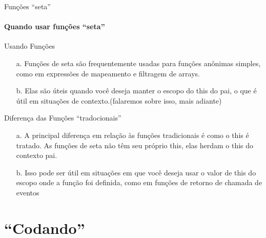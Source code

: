 \documentclass[13pt, xcolor={dvipsnames,svgnames}, portuguese]{beamer}
\begin{document}
\begin{frame}{Funções ``seta''}
\framesubtitle{Quando usar funções ``seta''}
	\begin{block}{Usando Funções}
		\begin{itemize}
		  \item[a.] Funções de seta são frequentemente usadas para funções anônimas simples, como em expressões de mapeamento e filtragem de arrays.
		  \pause
		  \item[b.] Elas são úteis quando você deseja manter o escopo do this do pai, o que é útil em situações de contexto.(falaremos sobre isso, mais adiante)
		\end{itemize}
	\end{block}
	\begin{block}{Diferença das Funções ``tradocionais''}
		\begin{itemize}
		  \item[a.] A principal diferença em relação às funções tradicionais é como o this é tratado. As funções de seta não têm seu próprio this, elas herdam o this do contexto pai.
		  \pause
		  \item[b.] Isso pode ser útil em situações em que você deseja usar o valor de this do escopo onde a função foi definida, como em funções de retorno de chamada de eventos
		\end{itemize}
	\end{block} 
\end{frame}

\section{``Codando''}
\end{document}

